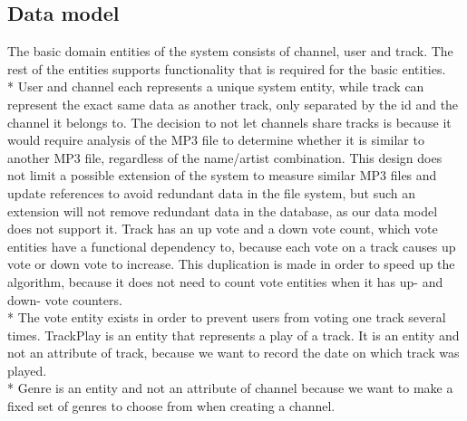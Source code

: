\documentclass[a4paper,11pt,report]{article}
\begin{document}
\subsection{Data model}
The basic domain entities of the system consists of channel, user and track. The rest of the entities supports functionality that is required for the basic entities. \\*
User and channel each represents a unique system entity, while track can represent the exact same data as another track, only separated by the id and the channel it belongs to.
The decision to not let channels share tracks is because it would require analysis of the MP3 file to determine whether it is similar to another MP3 file, regardless of the name/artist combination.
This design does not limit a possible extension of the system to measure similar MP3 files and update references to avoid redundant data in the file system, but such an extension will not remove redundant data in the database, as our data model does not support it. 
Track has an up vote and a down vote count, which vote entities have a functional dependency to, because each vote on a track causes up vote or down vote to increase. This duplication is made in order to speed up the algorithm, because it does not need to count vote entities when it has up- and down- vote counters. \\*
The vote entity exists in order to prevent users from voting one track several times.
TrackPlay is an entity that represents a play of a track. It is an entity and not an attribute of track, because we want to record the date on which track was played. \\*
Genre is an entity and not an attribute of channel because we want to make a fixed set of genres to choose from when creating a channel.
\end{document}
